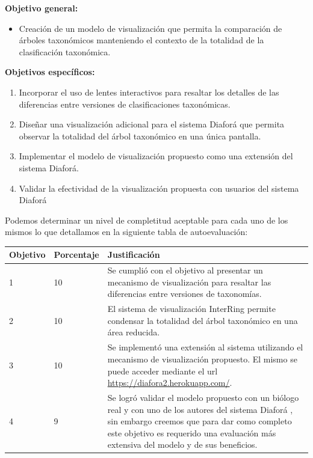 \documentclass[journal]{IEEEtran}
\begin{document}
\textbf{Objetivo general:}
\begin{itemize}
\item Creación de un modelo de visualización que permita la comparación de árboles taxonómicos manteniendo el contexto de la totalidad de la clasificación taxonómica.
\end{itemize}
\textbf{Objetivos específicos:}
\begin{enumerate}
\item Incorporar el uso de lentes interactivos para resaltar los detalles de las diferencias entre versiones de clasificaciones taxonómicas.
\item Diseñar una visualización adicional para el sistema Diaforá que permita observar la totalidad del árbol taxonómico en una única pantalla.
\item Implementar el modelo de visualización propuesto como una extensión del sistema Diaforá. 
\item Validar la efectividad de la visualización propuesta con usuarios del sistema Diaforá
\end{enumerate}
Podemos determinar un nivel de completitud aceptable para cada uno de los mismos lo que detallamos en la siguiente tabla de autoevaluación:
\begin{table}[]
  \begin{tabular}{|m{1cm}|m{1cm}|m{4cm}|}
  \hline
  Objetivo & Porcentaje & Justificación \\
  \hline \hline
  1 & 10 & Se cumplió con el objetivo al presentar un mecanismo de visualización para resaltar las diferencias entre versiones de taxonomías.\\
  \hline
  2 & 10 & El sistema de visualización InterRing \cite{yang_ward_rundensteiner} permite condensar la totalidad del árbol taxonómico en una área reducida. \\
  \hline
  3 & 10 & Se implementó una extensión al sistema utilizando el mecanismo de visualización propuesto. El mismo se puede acceder mediante el url \url{https://diafora2.herokuapp.com/}. \\
  \hline
  4 & 9 & Se logró validar el modelo propuesto con un biólogo real y con uno de los autores del sistema Diaforá \cite{sancho_diafora}, sin embargo creemos que para dar como completo este objetivo es requerido
  una evaluación más extensiva del modelo y  de sus beneficios. \\
\hline
\end{tabular}
  \end{table}
\end{document}
